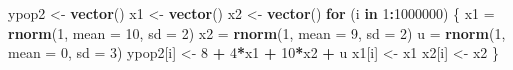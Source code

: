 \documentclass[]{article}
\newenvironment{Shaded}{\begin{snugshade}}{\end{snugshade}}
\newcommand{\KeywordTok}[1]{\textcolor[rgb]{0.13,0.29,0.53}{\textbf{#1}}}
\newcommand{\DataTypeTok}[1]{\textcolor[rgb]{0.13,0.29,0.53}{#1}}
\newcommand{\DecValTok}[1]{\textcolor[rgb]{0.00,0.00,0.81}{#1}}
\newcommand{\StringTok}[1]{\textcolor[rgb]{0.31,0.60,0.02}{#1}}
\newcommand{\ControlFlowTok}[1]{\textcolor[rgb]{0.13,0.29,0.53}{\textbf{#1}}}
\newcommand{\OperatorTok}[1]{\textcolor[rgb]{0.81,0.36,0.00}{\textbf{#1}}}
\newcommand{\NormalTok}[1]{#1}
\begin{document}
\begin{Shaded}
\begin{Highlighting}[]
\NormalTok{ypop2 <-}\StringTok{ }\KeywordTok{vector}\NormalTok{()}
\NormalTok{x1 <-}\StringTok{ }\KeywordTok{vector}\NormalTok{()}
\NormalTok{x2 <-}\StringTok{ }\KeywordTok{vector}\NormalTok{()}
\ControlFlowTok{for}\NormalTok{ (i }\ControlFlowTok{in} \DecValTok{1}\OperatorTok{:}\DecValTok{1000000}\NormalTok{) \{}
\NormalTok{  x1 =}\StringTok{ }\KeywordTok{rnorm}\NormalTok{(}\DecValTok{1}\NormalTok{, }\DataTypeTok{mean =} \DecValTok{10}\NormalTok{, }\DataTypeTok{sd =} \DecValTok{2}\NormalTok{)}
\NormalTok{  x2 =}\StringTok{ }\KeywordTok{rnorm}\NormalTok{(}\DecValTok{1}\NormalTok{, }\DataTypeTok{mean =} \DecValTok{9}\NormalTok{, }\DataTypeTok{sd =} \DecValTok{2}\NormalTok{)}
\NormalTok{  u =}\StringTok{ }\KeywordTok{rnorm}\NormalTok{(}\DecValTok{1}\NormalTok{, }\DataTypeTok{mean =} \DecValTok{0}\NormalTok{, }\DataTypeTok{sd =} \DecValTok{3}\NormalTok{)}
\NormalTok{  ypop2[i] <-}\StringTok{ }\DecValTok{8} \OperatorTok{+}\StringTok{ }\DecValTok{4}\OperatorTok{*}\NormalTok{x1 }\OperatorTok{+}\StringTok{ }\DecValTok{10}\OperatorTok{*}\NormalTok{x2 }\OperatorTok{+}\StringTok{ }\NormalTok{u }
\NormalTok{  x1[i] <-}\StringTok{ }\NormalTok{x1}
\NormalTok{  x2[i] <-}\StringTok{ }\NormalTok{x2}
\NormalTok{\}}
\end{Highlighting}
\end{Shaded}
\end{document}
